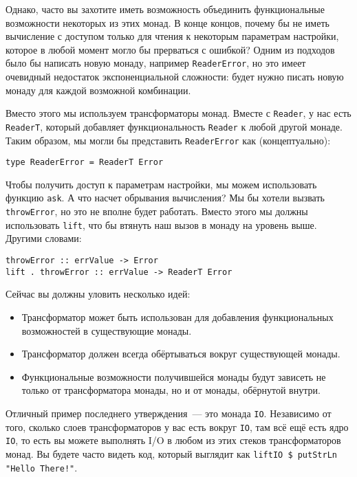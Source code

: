 Однако, часто вы захотите иметь возможность объединить функциональные возможности 
некоторых из этих монад. В конце концов, почему бы не иметь вычисление с доступом только
для чтения к некоторым параметрам настройки, которое в любой момент могло бы прерваться с
ошибкой? Одним из подходов было бы написать новую монаду, например
\lstinline'ReaderError', но это имеет очевидный недостаток экспоненциальной сложности:
будет нужно писать новую монаду для каждой возможной комбинации.

Вместо этого мы используем трансформаторы монад. Вместе с \lstinline'Reader', у нас есть
\lstinline'ReaderT', который добавляет функциональность \lstinline'Reader' к любой другой
монаде. Таким образом, мы могли бы представить \lstinline'ReaderError' как
(концептуально):

\begin{lstlisting}
type ReaderError = ReaderT Error
\end{lstlisting}

Чтобы получить доступ к параметрам настройки, мы можем использовать функцию
\lstinline'ask'. А что насчет обрывания вычисления? Мы бы хотели вызвать
\lstinline'throwError', но это не вполне будет работать. Вместо этого мы должны
использовать \lstinline'lift', что бы втянуть наш вызов в монаду на уровень выше. Другими
словами:

\begin{lstlisting}
throwError :: errValue -> Error
lift . throwError :: errValue -> ReaderT Error
\end{lstlisting}
  
Сейчас вы должны уловить несколько идей:
\begin{itemize}
\item  Трансформатор может быть использован для добавления функциональных возможностей в
существующие монады.
\item  Трансформатор должен всегда обёртываться вокруг существующей монады.
\item  Функциональные возможности получившейся монады будут зависеть не только от
трансформатора монады, но и от монады, обёрнутой внутри.
\end{itemize}

Отличный пример последнего утверждения~--- это монада \lstinline'IO'. Независимо от того,
сколько слоев трансформаторов у вас есть вокруг \lstinline'IO', там всё ещё есть ядро
\lstinline'IO', то есть вы можете выполнять I/O в любом из этих стеков трансформаторов
монад. Вы будете часто видеть код, который выглядит как 
\lstinline'liftIO $ putStrLn "Hello There!"'.


